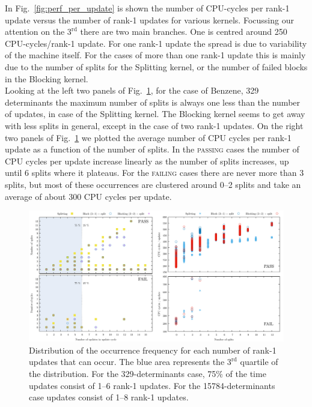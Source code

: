 \documentclass[11pt]{article}
\numberwithin{figure}{section}
\numberwithin{table}{section}
\begin{document}
    	In Fig.~\ref{fig:perf_per_update} is shown the number of CPU-cycles per rank-1 update versus the number of rank-1 updates for various kernels. Focussing our attention on the $3^\mathrm{rd}$ there are two main branches. One is centred around 250 CPU-cycles/rank-1 update. For one rank-1 update the spread is due to variability of the machine itself. For the cases of more than one rank-1 update this is mainly due to the number of splits for the Splitting kernel, or the number of failed blocks in the Blocking kernel.\\
    					
    	Looking at the left two panels of Fig.~\ref{upds_nsplits_cpucycles}, for the case of Benzene, 329 determinants the maximum number of splits is always one less than the number of updates, in case of the Splitting kernel. The Blocking kernel seems to get away with less splits in general, except in the case of two rank-1 updates. On the right two panels of Fig.~\ref{upds_nsplits_cpucycles} we plotted the average number of CPU cycles per rank-1 update as a function of the number of splits. In  the \textsc{passing} cases the number of CPU cycles per update increase linearly as the number of splits increases, up until 6 splits where it plateaus. For the \textsc{failing} cases there are never more than 3 splits, but most of these occurrences are clustered around 0--2 splits and take an average of about 300 CPU cycles per update. 
    
    	\begin{figure}[h]
    		\centering
    		\includegraphics[width=1\textwidth]{upds_nsplits_cpucycles.png}
    		\caption{Distribution of the occurrence frequency for each number of rank-1 updates that can occur. The blue area represents the $3^\mathrm{rd}$ quartile of the distribution. For the 329-determinants case, 75\% of the time updates consist of 1--6 rank-1 updates. For the 15784-determinants case updates consist of 1--8 rank-1 updates.}
    		\label{upds_nsplits_cpucycles}
    	\end{figure}
						
\end{document}
